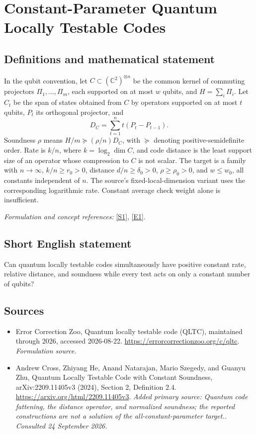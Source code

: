 \documentclass[11pt]{article}
\begin{document}
\section*{\texorpdfstring{Constant-Parameter Quantum Locally Testable Codes}{Constant-Parameter Quantum Locally Testable Codes}}\label{30006879}
\subsection{Definitions and mathematical statement}
In the qubit convention, let $C\subset({\mathbb{C}}^2)^{\otimes n}$ be the common kernel of commuting projectors $\Pi_1,\ldots,\Pi_m$, each supported on at most $w$ qubits, and $H=\sum_i\Pi_i$. Let $C_t$ be the span of states obtained from $C$ by operators supported on at most $t$ qubits, $P_t$ its orthogonal projector, and
\[
 D_C=\sum_{t=1}^n t(P_t-P_{t-1}).
\]
Soundness $\rho$ means $H/m\succeq(\rho/n)D_C$, with $\succeq$ denoting positive-semidefinite order. Rate is $k/n$, where $k=\log_2\dim C$, and code distance is the least support size of an operator whose compression to $C$ is not scalar. The target is a family with $n\to\infty$, $k/n\ge r_0>0$, distance $d/n\ge\delta_0>0$, $\rho\ge\rho_0>0$, and $w\le w_0$, all constants independent of $n$. The source's fixed-local-dimension variant uses the corresponding logarithmic rate. Constant average check weight alone is insufficient.
\par\smallskip\textit{Formulation and concept references:} \href{https://errorcorrectionzoo.org/c/qltc}{[S1]}, \href{https://arxiv.org/html/2209.11405v3}{[E1]}.

\subsection{Short English statement}
Can quantum locally testable codes simultaneously have positive constant rate, relative distance, and soundness while every test acts on only a constant number of qubits?
\subsection{Sources}
\begin{itemize}
\item[S1]Error Correction Zoo, Quantum locally testable code (QLTC), maintained through 2026, accessed 2026-08-22.
\url{https://errorcorrectionzoo.org/c/qltc}.
\textit{Formulation source.}
\item[E1]Andrew Cross, Zhiyang He, Anand Natarajan, Mario Szegedy, and Guanyu Zhu, Quantum Locally Testable Code with Constant Soundness, arXiv:2209.11405v3 (2024), Section 2, Definition 2.4.
\url{https://arxiv.org/html/2209.11405v3}.
\textit{Added primary source: Quantum code fattening, the distance operator, and normalized soundness; the reported constructions are not a solution of the all-constant-parameter target.. Consulted 24 September 2026.}
\end{itemize}
\end{document}
